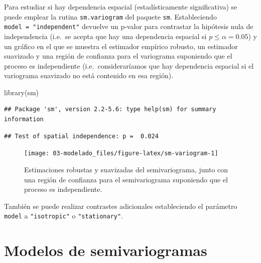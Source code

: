 \documentclass[
  spanish,
]{book}
\newenvironment{Shaded}{\begin{snugshade}}{\end{snugshade}}
\newcommand{\AttributeTok}[1]{\textcolor[rgb]{0.77,0.63,0.00}{#1}}
\newcommand{\FunctionTok}[1]{\textcolor[rgb]{0.00,0.00,0.00}{#1}}
\newcommand{\NormalTok}[1]{#1}
\newcommand{\SpecialCharTok}[1]{\textcolor[rgb]{0.00,0.00,0.00}{#1}}
\newcommand{\StringTok}[1]{\textcolor[rgb]{0.31,0.60,0.02}{#1}}
\theoremstyle{break}
\theoremstyle{definition}
\theoremstyle{definition}
\theoremstyle{definition}
\theoremstyle{definition}
\theoremstyle{remark}
\begin{document}
Para estudiar si hay dependencia espacial (estadísticamente significativa) se puede emplear la rutina \texttt{sm.variogram} del paquete \texttt{sm}.
Estableciendo \texttt{model\ =\ "independent"} devuelve un p-valor para contrastar la hipótesis nula de independencia
(i.e.~se acepta que hay una dependencia espacial si \(p \leq \alpha = 0.05\)) y un gráfico en el que se muestra el estimador empírico robusto, un estimador suavizado y una región de confianza para el variograma suponiendo que el proceso es independiente (i.e.~consideraríamos que hay dependencia espacial si el variograma suavizado no está contenido en esa región).

\begin{Shaded}
\begin{Highlighting}[]
\FunctionTok{library}\NormalTok{(sm)}
\end{Highlighting}
\end{Shaded}

\begin{verbatim}
## Package 'sm', version 2.2-5.6: type help(sm) for summary information
\end{verbatim}

\begin{Shaded}
\end{Shaded}

\begin{verbatim}
## Test of spatial independence: p =  0.024
\end{verbatim}

\begin{figure}[!htb]

{\centering \texttt{[image: 03-modelado\_files/figure-latex/sm-variogram-1]} 

}

\caption{Estimaciones robustas y suavizadas del semivariograma, junto con una región de confianza para el semivariograma suponiendo que el proceso es independiente.}\label{fig:sm-variogram}
\end{figure}

También se puede realizar contrastes adicionales estableciendo el parámetro \texttt{model} a \texttt{"isotropic"} o \texttt{"stationary"}.

\hypertarget{modelos-variog}{%
\section{Modelos de semivariogramas}\label{modelos-variog}}
\end{document}
